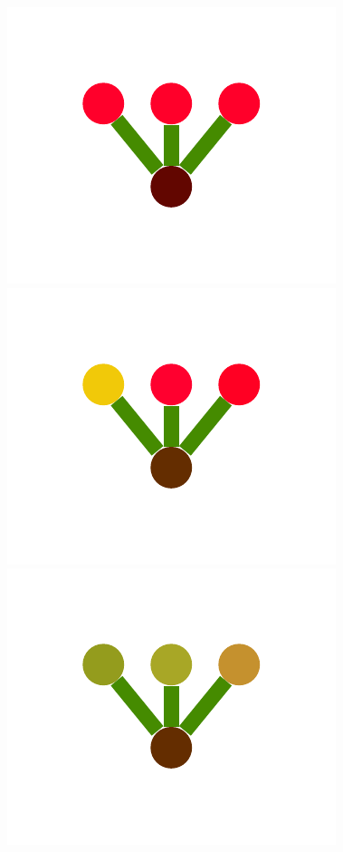 \documentclass[a4paper,10pt]{article}
\begin{document}
\begin{figure}
{    \includegraphics[scale=.2]{../figures/vector/6-2-multiple-color-flower-data-6.pdf}
    \includegraphics[scale=.2]{../figures/vector/6-2-multiple-color-flower-data-7.pdf}
    \includegraphics[scale=.2]{../figures/vector/6-2-multiple-color-flower-data-8.pdf}
    \label{fig:exp-multiple-flower-data}
}
\end{figure}
\end{document}
